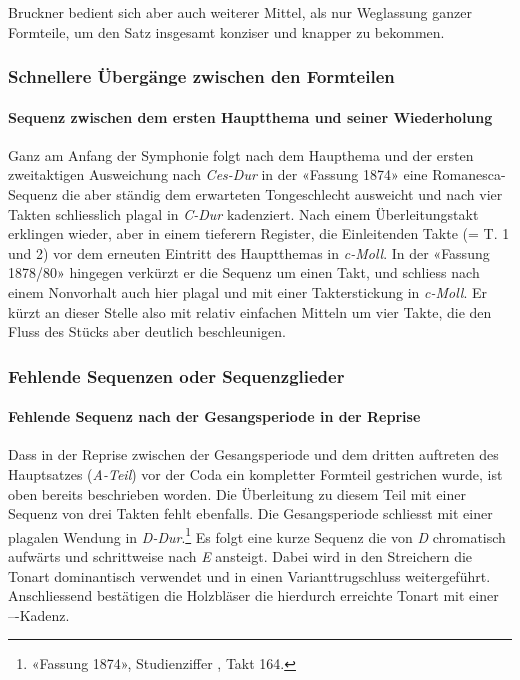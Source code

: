 Bruckner bedient sich aber auch weiterer Mittel, als nur Weglassung ganzer Formteile, um den Satz insgesamt konziser und knapper zu bekommen.

\subsubsection{Schnellere Übergänge zwischen den Formteilen}

\paragraph{Sequenz zwischen dem ersten Hauptthema und seiner Wiederholung}

Ganz am Anfang der Symphonie folgt nach dem Haupthema und der ersten zweitaktigen Ausweichung nach \emph{Ces-Dur} in der «Fassung 1874» eine Romanesca-Sequenz die aber ständig dem erwarteten Tongeschlecht ausweicht und nach vier Takten schliesslich plagal in \emph{C-Dur} kadenziert.
Nach einem Überleitungstakt erklingen wieder, aber in einem tieferern Register, die Einleitenden Takte (= T. 1 und 2) vor dem erneuten Eintritt des Hauptthemas in \emph{c-Moll}.
In der «Fassung 1878/80» hingegen verkürzt er die Sequenz um einen Takt, und schliess nach einem Nonvorhalt auch hier plagal und mit einer Takterstickung in \emph{c-Moll}.
Er kürzt an dieser Stelle also mit relativ einfachen Mitteln um vier Takte, die den Fluss des Stücks aber deutlich beschleunigen.


\subsubsection{Fehlende Sequenzen oder Sequenzglieder}

\paragraph{Fehlende Sequenz nach der Gesangsperiode in der Reprise}

Dass in der Reprise zwischen der Gesangsperiode und dem dritten auftreten des Hauptsatzes (\emph{A-Teil}) vor der Coda ein kompletter Formteil gestrichen wurde, ist oben bereits beschrieben worden.
Die Überleitung zu diesem Teil mit einer Sequenz von drei Takten fehlt ebenfalls.
Die Gesangsperiode schliesst mit einer plagalen Wendung in \emph{D-Dur}.\footnote{«Fassung 1874», Studienziffer , Takt 164.}
Es folgt eine kurze Sequenz die von \emph{D} chromatisch aufwärts und schrittweise nach \emph{E} ansteigt.
Dabei wird in den Streichern die Tonart dominantisch verwendet und in einen Varianttrugschluss weitergeführt.
Anschliessend bestätigen die Holzbläser die hierdurch erreichte Tonart mit einer ---Kadenz.

